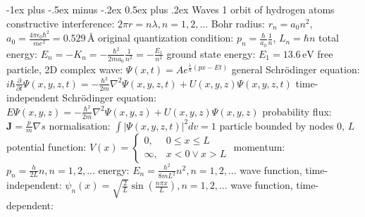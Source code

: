 \documentclass[10pt,landscape]{article}
\makeatletter
\renewcommand{\subsection}{\@startsection{subsection}{2}{0mm}%
                                {-1ex plus -.5ex minus -.2ex}%
                                {0.5ex plus .2ex}%
                                {\normalfont\normalsize\bfseries}}
\newcommand{\spc}{\hspace*{1em}}
\makeatother
\begin{document}
\begin{multicols*}{3}
\subsection{Waves 1}
orbit of hydrogen atoms
\newline
\spc constructive interference: $2\pi r=n\lambda,n=1,2,...$
\newline
\spc Bohr radius: $r_n=a_0n^2$, $a_0=\frac{4\pi\epsilon_0\hbar^2}{me^2}=0.529\,\textrm{\AA }$
\newline
\spc original quantization condition: $p_n=\frac{\hbar}{a_0}\frac{1}{n}$,  $L_n=\hbar n$
\newline
\spc total energy: $E_n=-K_n=-\frac{\hbar^2}{2ma_0}\frac{1}{n^2}=-\frac{E_1}{n^2}$
\newline
\spc ground state energy: $E_1=13.6\,\textrm{eV}$
\newline \newline
free particle, 2D complex wave: $\Psi(x,t)=Ae^{\frac{1}{\hbar}(px-Et)}$
\newline
\newline
general Schrödinger equation:
\newline
\spc $i\hbar \frac{\partial}{\partial t}\Psi(x,y,z,t)=-\frac{\hbar^2}{2m}\nabla^2\Psi(x,y,z,t)+U(x,y,z)\Psi(x,y,z,t)$
\newline
time-independent Schrödinger equation:
\newline
\spc $E\Psi(x,y,z)=-\frac{\hbar^2}{2m}\nabla^2\Psi(x,y,z)+U(x,y,z)\Psi(x,y,z)$
\newline
probability flux: $\mathbf{J}=\frac{p}{m}\nabla s$
\newline
normalisation: $\int |\Psi(x,y,z,t)|^2dv=1$
\newline %
particle bounded by nodes $0$, $L$
\newline
\spc potential function: $V(x)=\left\{\begin{matrix}
0,&0\leq x\leq L\\ \infty,&x<0\vee x>L 
\end{matrix}\right.$
\newline
\spc momentum: $p_n=\frac{h}{2L}n,n=1,2,...$
\newline
\spc energy: $E_n=\frac{h^2}{8mL^2}n^2,n=1,2,...$
\newline
\spc wave function, time-independent:
\newline
\spc \spc $\psi_n(x)=\sqrt{\frac{2}{L}}\sin(\frac{n\pi x}{L}),n=1,2,...$
\newline
\spc wave function, time-dependent:

\end{multicols*}
\end{document}
